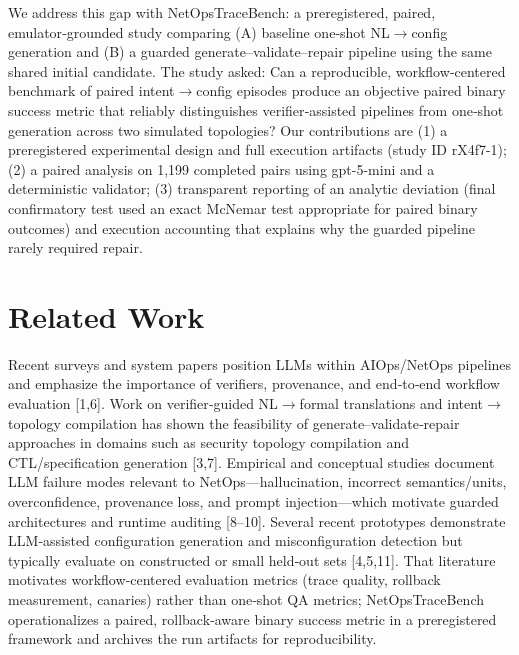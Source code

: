 \documentclass[conference]{IEEEtran}
\begin{document}
We address this gap with NetOpsTraceBench: a preregistered, paired, emulator‑grounded study comparing (A) baseline one‑shot NL\ensuremath{\rightarrow}config generation and (B) a guarded generate--validate--repair pipeline using the same shared initial candidate. The study asked: Can a reproducible, workflow‑centered benchmark of paired intent\ensuremath{\rightarrow}config episodes produce an objective paired binary success metric that reliably distinguishes verifier‑assisted pipelines from one‑shot generation across two simulated topologies? Our contributions are (1) a preregistered experimental design and full execution artifacts (study ID rX4f7-1); (2) a paired analysis on 1,199 completed pairs using gpt-5-mini and a deterministic validator; (3) transparent reporting of an analytic deviation (final confirmatory test used an exact McNemar test appropriate for paired binary outcomes) and execution accounting that explains why the guarded pipeline rarely required repair.

\section{Related Work}
Recent surveys and system papers position LLMs within AIOps/NetOps pipelines and emphasize the importance of verifiers, provenance, and end‑to‑end workflow evaluation [1,6]. Work on verifier‑guided NL\ensuremath{\rightarrow}formal translations and intent\ensuremath{\rightarrow}topology compilation has shown the feasibility of generate--validate‑repair approaches in domains such as security topology compilation and CTL/specification generation [3,7]. Empirical and conceptual studies document LLM failure modes relevant to NetOps---hallucination, incorrect semantics/units, overconfidence, provenance loss, and prompt injection---which motivate guarded architectures and runtime auditing [8--10]. Several recent prototypes demonstrate LLM‑assisted configuration generation and misconfiguration detection but typically evaluate on constructed or small held‑out sets [4,5,11]. That literature motivates workflow‑centered evaluation metrics (trace quality, rollback measurement, canaries) rather than one‑shot QA metrics; NetOpsTraceBench operationalizes a paired, rollback‑aware binary success metric in a preregistered framework and archives the run artifacts for reproducibility.
\end{document}
